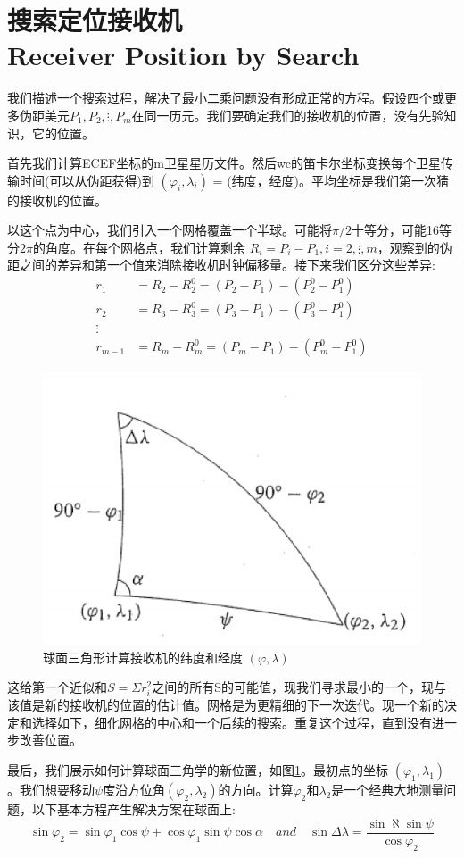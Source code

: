 \section[搜索定位接收机]{搜索定位接收机\\Receiver Position by Search}
	我们描述一个搜索过程，解决了最小二乘问题没有形成正常的方程。假设四个或更多伪距美元$P_1,P_2,\vdots,P_m$在同一历元。我们要确定我们的接收机的位置，没有先验知识，它的位置。
		
	首先我们计算ECEF坐标的m卫星星历文件。然后wc的笛卡尔坐标变换每个卫星传输时间(可以从伪距获得)到 $(\varphi_i,\lambda_i)$ = (纬度，经度)。平均坐标是我们第一次猜的接收机的位置。
		
	以这个点为中心，我们引入一个网格覆盖一个半球。可能将$\pi/2$十等分，可能16等分$2\pi$的角度。在每个网格点，我们计算剩余 $R_i=P_i-P_1,i=2,\vdots,m $，观察到的伪距之间的差异和第一个值来消除接收机时钟偏移量。接下来我们区分这些差异:
	\begin{align*}
		r_1& = R_2-R^0_2 = (P_2-P_1) - (P^0_2-P^0_1) \\
		r_2& = R_3-R^0_3 = (P_3-P_1) - (P^0_3-P^0_1) \\
		\vdots& \\
		r_{m-1}& = R_m-R^0_m = (P_m-P_1) - (P^0_m-P^0_1) 
	\end{align*}
	\begin{figure}
			\centering
			\includegraphics[width=0.7\linewidth]{TeX_files/Part03/chapter09/image/9-15}
			\caption{球面三角形计算接收机的纬度和经度 $(\varphi,\lambda)$}
			\label{fig:9-15}
	\end{figure}

	这给第一个近似和$S=\Sigma r^2_i$之间的所有S的可能值，现我们寻求最小的一个，现与该值是新的接收机的位置的估计值。网格是为更精细的下一次迭代。现一个新的决定和选择如下，细化网格的中心和一个后续的搜索。重复这个过程，直到没有进一步改善位置。

	最后，我们展示如何计算球面三角学的新位置，如图\ref{fig:9-15}。最初点的坐标 $(\varphi_1,\lambda_1)$。我们想要移动$\psi$度沿方位角$(\varphi_2,\lambda_2)$的方向。计算$\varphi_2$和$\lambda_2$是一个经典大地测量问题，以下基本方程产生解决方案在球面上:
	\begin{equation}\label{eq:9.32}
		\sin\varphi_2 = \sin\varphi_1\cos\psi+\cos\varphi_1\sin\psi\cos\alpha\quad and \quad \sin\Delta\lambda=\dfrac{\sin\aleph\sin\psi}{\cos\varphi_2}
	\end{equation}

